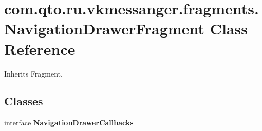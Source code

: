 \hypertarget{classcom_1_1qto_1_1ru_1_1vkmessanger_1_1fragments_1_1_navigation_drawer_fragment}{}\section{com.\+qto.\+ru.\+vkmessanger.\+fragments.\+Navigation\+Drawer\+Fragment Class Reference}
\label{classcom_1_1qto_1_1ru_1_1vkmessanger_1_1fragments_1_1_navigation_drawer_fragment}


Inherits Fragment.

\subsection*{Classes}
\begin{DoxyCompactItemize}
\item 
interface {\bfseries Navigation\+Drawer\+Callbacks}
\end{DoxyCompactItemize}

